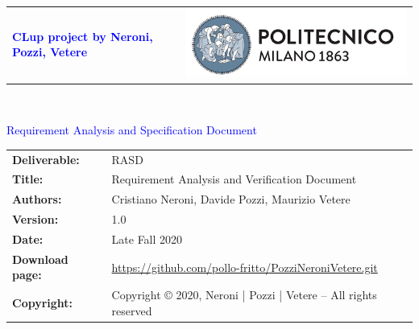 


\sffamily
    
    
    \begin{titlepage}
        

        
        {\begin{table}[t!]
                \centering
                \begin{tabu} to \textwidth { X[1.3,r,p] X[1.7,l,p] }
                    \textcolor{Blue}
                    {\textbf{\small{\textsf{CLup project by Neroni, Pozzi, Vetere}}}} & \includegraphics[scale=0.4]{Images/PolimiLogo}
                \end{tabu}
            \end{table}}~\\ [7cm]
        
        \begin{flushleft}
            
            {\textcolor{blue}{\textrm{\Huge{Requirement Analysis and Specification Document}}}} \\ [1cm]
            
        \end{flushleft}
        
    \end{titlepage}
    
    \begin{table}[h!]
        \begin{tabu} to \textwidth { X[0.3,r,p] X[0.7,l,p] }
            \hline
            
            \textbf{Deliverable:} & RASD\\
            \textbf{Title:} & Requirement Analysis and Verification Document \\
            \textbf{Authors:} & Cristiano Neroni, Davide Pozzi, Maurizio Vetere \\
            \textbf{Version:} & 1.0 \\ 
            \textbf{Date:} & Late Fall 2020 \\
            \textbf{Download page:} & \small \url{https://github.com/pollo-fritto/PozziNeroniVetere.git} \\
            \textbf{Copyright:} & Copyright © 2020, Neroni | Pozzi | Vetere – All rights reserved \\
            \hline
        \end{tabu}
    \end{table}
    
